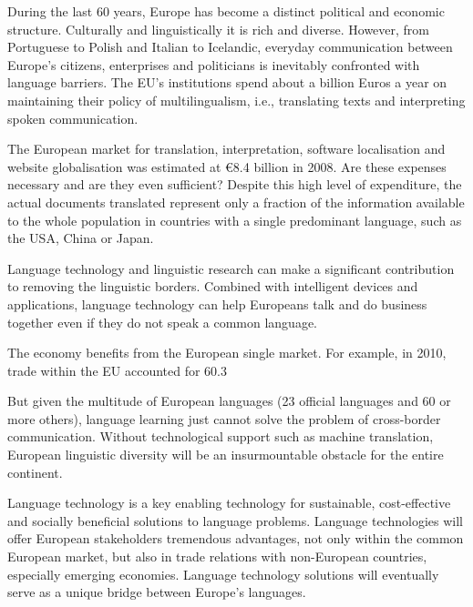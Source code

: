 \documentclass[10pt, plain]{../../metanetpaper}
\begin{document}
\begin{multicols}{2}
During the last 60 years, Europe has become a distinct political and economic structure. Culturally and linguistically it is rich and diverse. However, from Portuguese to Polish and Italian to Icelandic, everyday communication between Europe's citizens, enterprises and politicians is inevitably confronted with language barriers. The EU's institutions spend about a billion Euros a year on maintaining their policy of multilingualism, i.e., translating texts and interpreting spoken communication.

The European market for translation, interpretation, software localisation and website globalisation was estimated at €8.4 billion in 2008. Are these expenses necessary and are they even sufficient? Despite this high level of expenditure, the actual documents translated represent only a fraction of the information available to the whole population in countries with a single predominant language, such as the USA, China or Japan.

Language technology and linguistic research can make a significant contribution to removing the linguistic borders. Combined with intelligent devices and applications, language technology can help Europeans talk and do business together even if they do not speak a common language.

The economy benefits from the European single market. For example, in 2010, trade within the EU accounted for 60.3%

But given the multitude of European languages (23 official languages and 60 or more others), language learning just cannot solve the problem of cross-border communication. Without technological support such as machine translation, European linguistic diversity will be an insurmountable obstacle for the entire continent.

Language technology is a key enabling technology for sustainable, cost-effective and socially beneficial solutions to language problems. Language technologies will offer European stakeholders tremendous advantages, not only within the common European market, but also in trade relations with non-European countries, especially emerging economies. Language technology solutions will eventually serve as a unique bridge between Europe's languages.


\end{multicols}
\end{document}

